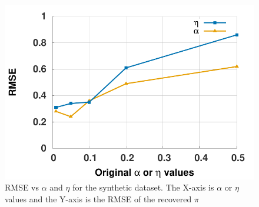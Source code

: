 \documentclass{sig-alternate}
\begin{document}
\begin{figure}
\centering
  \includegraphics[width=1\linewidth]{figs/stability.pdf}
\vspace*{-2\baselineskip}
\caption{\small{RMSE vs $\alpha$ and $\eta$ for the synthetic dataset. The X-axis is
$\alpha$ or $\eta$ values and the Y-axis is the RMSE of the recovered $\pi$}}
\label{fig:syntheticRMSE}
\vspace*{-1\baselineskip}
\end{figure}
 
\end{document}

